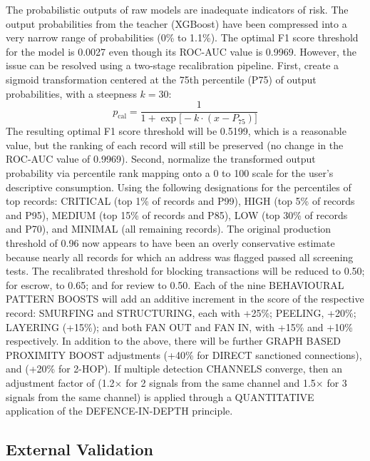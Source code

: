 \documentclass[journal]{IEEEtran}
\begin{document}
The probabilistic outputs of raw models are inadequate indicators of risk. The output probabilities from the teacher (XGBoost) have been compressed into a very narrow range of probabilities (0\% to 1.1\%). The optimal F1 score threshold for the model is 0.0027 even though its ROC-AUC value is 0.9969. However, the issue can be resolved using a two-stage recalibration pipeline. First, create a sigmoid transformation centered at the 75th percentile (P75) of output probabilities, with a steepness $k = 30$:
\begin{equation}
p_{\text{cal}} = \frac{1}{1 + \exp\!\bigl[-k \cdot (x - P_{75})\bigr]}
\label{eq:recalibration}
\end{equation}
The resulting optimal F1 score threshold will be 0.5199, which is a reasonable value, but the ranking of each record will still be preserved (no change in the ROC-AUC value of 0.9969). Second, normalize the transformed output probability via percentile rank mapping onto a 0 to 100 scale for the user's descriptive consumption. Using the following designations for the percentiles of top records: CRITICAL (top 1\% of records and P99), HIGH (top 5\% of records and P95), MEDIUM (top 15\% of records and P85), LOW (top 30\% of records and P70), and MINIMAL (all remaining records). The original production threshold of 0.96 now appears to have been an overly conservative estimate because nearly all records for which an address was flagged passed all screening tests. The recalibrated threshold for blocking transactions will be reduced to 0.50; for escrow, to 0.65; and for review to 0.50. Each of the nine BEHAVIOURAL PATTERN BOOSTS will add an additive increment in the score of the respective record: SMURFING and STRUCTURING, each with +25\%; PEELING, +20\%; LAYERING (+15\%); and both FAN OUT and FAN IN, with +15\% and +10\% respectively. In addition to the above, there will be further GRAPH BASED PROXIMITY BOOST adjustments (+40\% for DIRECT sanctioned connections), and (+20\% for 2-HOP). If multiple detection CHANNELS converge, then an adjustment factor of (1.2$\times$ for 2 signals from the same channel and 1.5$\times$ for 3 signals from the same channel) is applied through a QUANTITATIVE application of the DEFENCE-IN-DEPTH principle.

\subsection{External Validation}
\end{document}
